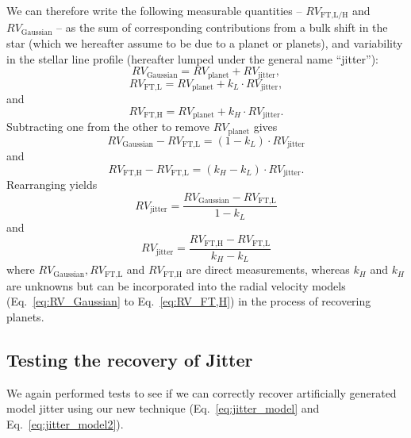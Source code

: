 We can therefore write the following measurable quantities -- $RV_\text{FT,L/H}$ and $RV_\text{Gaussian}$ --
as the sum of corresponding contributions from a bulk shift in the star (which
we hereafter assume to be due to a planet or planets), and variability in the stellar line
profile (hereafter lumped under the general name ``jitter''):
\begin{equation}
	RV_\text{Gaussian} = RV_\text{planet} + RV_\text{jitter},
\label{eq:RV_Gaussian}
\end{equation}
\begin{equation}
	RV_\text{FT,L} = RV_\text{planet} + k_L \cdot RV_\text{jitter},
\label{eq:RV_FT,L}
\end{equation}
and 
\begin{equation}
	RV_\text{FT,H} = RV_\text{planet} + k_H \cdot RV_\text{jitter}.
\label{eq:RV_FT,H}
\end{equation}
Subtracting one from the other to remove $RV_\text{planet}$ gives
\begin{equation}
	RV_\text{Gaussian} - RV_\text{FT,L} = (1-k_L) \cdot RV_\text{jitter}
\end{equation}
and 
\begin{equation}
	RV_\text{FT,H} - RV_\text{FT,L} = (k_H-k_L) \cdot RV_\text{jitter}.
\end{equation}
Rearranging yields 
\begin{equation}
	RV_\text{jitter} = \frac{RV_\text{Gaussian} - RV_\text{FT,L}}{1-k_L}
\label{eq:jitter_model}
\end{equation}
and 
\begin{equation}
	RV_\text{jitter} = \frac{RV_\text{FT,H} - RV_\text{FT,L}}{k_H-k_L}
\label{eq:jitter_model2}
\end{equation}
where $RV_\text{Gaussian}, RV_\text{FT,L}$ and $RV_\text{FT,H}$ are direct measurements, whereas $k_H$ and $k_H$ are unknowns but can be incorporated into the radial velocity models (Eq.~\ref{eq:RV_Gaussian} to Eq.~\ref{eq:RV_FT,H}) in the process of recovering planets.



\subsection{Testing the recovery of Jitter}
\label{sec:check}

We again performed tests to see if we can correctly recover artificially generated model jitter
using our new technique (Eq.~\ref{eq:jitter_model} and Eq.~\ref{eq:jitter_model2}). 


